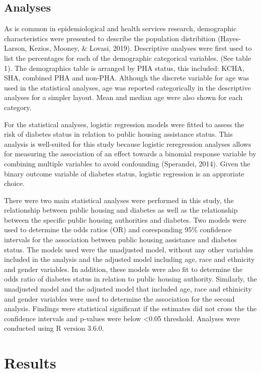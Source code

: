 \documentclass [11pt, proquest] {uwthesis}[2015/03/03]
\begin{document}
\section{Analyses}\label{analyses}

As is common in epidemiological and health services research,
demographic characteristics were presented to describe the population
distribition (Hayes-Larson, Kezios, Mooney, \& Lovasi, 2019).
Descriptive analyses were first used to list the percentages for each of
the demographic categorical variables. (See table 1). The demographics
table is arranged by PHA status, this included: KCHA, SHA, combined PHA
and non-PHA. Although the discrete variable for age was used in the
statistical analyses, age was reported categorically in the descriptive
analyses for a simpler layout. Mean and median age were also shown for
each category.

For the statistical analyses, logistic regression models were fitted to
assess the risk of diabetes status in relation to public housing
assistance status. This analysis is well-suited for this study because
logistic reregression analyses allows for measuring the association of
an effect towards a binomial response variable by combining multiple
variables to avoid confounding (Sperandei, 2014). Given the binary
outcome variable of diabetes status, logistic regression is an
approriate choice.

There were two main statistical analyses were performed in this study,
the relationship between public housing and diabetes as well as the
relationship between the specific public housing authorities and
diabetes. Two models were used to determine the odds ratios (OR) and
coresponding 95\% confidence intervals for the association between
public housing assistance and diabetes status. The models used were the
unadjusted model, without any other variables included in the analysis
and the adjusted model including age, race and ethnicity and gender
variables. In addition, these models were also fit to determine the odds
ratio of diabetes status in relation to public housing authority.
Similarly, the unadjusted model and the adjusted model that included
age, race and ethinicity and gender variables were used to determine the
association for the second analysis. Findings were statistical
significant if the estimates did not cross the the confidence intervals
and p-values were below \textless{}0.05 threshold. Analyses were
conducted using R version 3.6.0.

\chapter{Results}\label{ref-labels}
\end{document}
